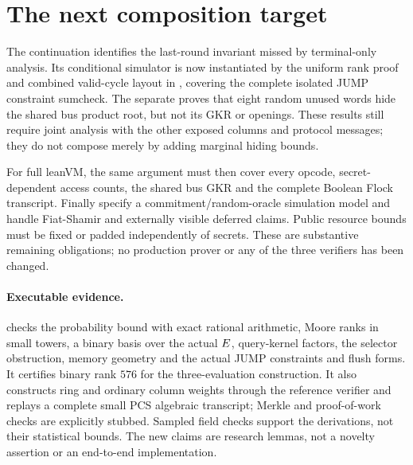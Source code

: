 \documentclass[11pt]{article}
\begin{document}
\section{The next composition target}

The continuation  identifies the last-round invariant missed by terminal-only analysis. Its conditional simulator is now instantiated by the uniform rank proof and combined valid-cycle layout in , covering the complete isolated JUMP constraint sumcheck. The separate  proves that eight random unused words hide the shared bus product root, but not its GKR or openings. These results still require joint analysis with the other exposed columns and protocol messages; they do not compose merely by adding marginal hiding bounds.

For full leanVM, the same argument must then cover every opcode, secret-dependent access counts, the shared bus GKR and the complete Boolean Flock transcript. Finally specify a commitment/random-oracle simulation model and handle Fiat-Shamir and externally visible deferred claims. Public resource bounds must be fixed or padded independently of secrets. These are substantive remaining obligations; no production prover or any of the three verifiers has been changed.

\paragraph{Executable evidence.}  checks the probability bound with exact rational arithmetic, Moore ranks in small towers, a binary basis over the actual $E$, query-kernel factors, the selector obstruction, memory geometry and the actual JUMP constraints and flush forms. It certifies binary rank $576$ for the three-evaluation construction. It also constructs ring and ordinary column weights through the reference verifier and replays a complete small PCS algebraic transcript; Merkle and proof-of-work checks are explicitly stubbed. Sampled field checks support the derivations, not their statistical bounds. The new claims are research lemmas, not a novelty assertion or an end-to-end implementation.
\end{document}

